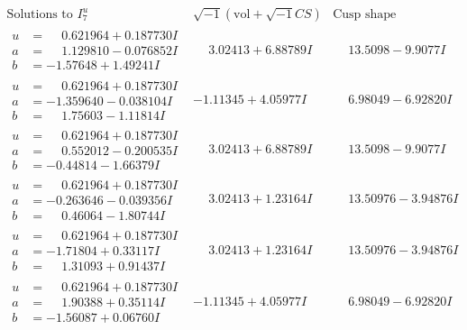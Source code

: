 \documentclass[1p]{elsarticle_modified}
\theoremstyle{definition}
\newcommand{\I}{\sqrt{-1}}
\begin{document}
$$\begin{array}{c|c|c}  
\text{Solutions to }I^u_{7}& \I (\text{vol} + \sqrt{-1}CS) & \text{Cusp shape}\\
 \hline 
\begin{aligned}
u &= \phantom{-}0.621964 + 0.187730 I \\
a &= \phantom{-}1.129810 - 0.076852 I \\
b &= -1.57648 + 1.49241 I\end{aligned}
 & \phantom{-}3.02413 + 6.88789 I & \phantom{-}13.5098 - 9.9077 I \\ \hline\begin{aligned}
u &= \phantom{-}0.621964 + 0.187730 I \\
a &= -1.359640 - 0.038104 I \\
b &= \phantom{-}1.75603 - 1.11814 I\end{aligned}
 & -1.11345 + 4.05977 I & \phantom{-}6.98049 - 6.92820 I \\ \hline\begin{aligned}
u &= \phantom{-}0.621964 + 0.187730 I \\
a &= \phantom{-}0.552012 - 0.200535 I \\
b &= -0.44814 - 1.66379 I\end{aligned}
 & \phantom{-}3.02413 + 6.88789 I & \phantom{-}13.5098 - 9.9077 I \\ \hline\begin{aligned}
u &= \phantom{-}0.621964 + 0.187730 I \\
a &= -0.263646 - 0.039356 I \\
b &= \phantom{-}0.46064 - 1.80744 I\end{aligned}
 & \phantom{-}3.02413 + 1.23164 I & \phantom{-}13.50976 - 3.94876 I \\ \hline\begin{aligned}
u &= \phantom{-}0.621964 + 0.187730 I \\
a &= -1.71804 + 0.33117 I \\
b &= \phantom{-}1.31093 + 0.91437 I\end{aligned}
 & \phantom{-}3.02413 + 1.23164 I & \phantom{-}13.50976 - 3.94876 I \\ \hline\begin{aligned}
u &= \phantom{-}0.621964 + 0.187730 I \\
a &= \phantom{-}1.90388 + 0.35114 I \\
b &= -1.56087 + 0.06760 I\end{aligned}
 & -1.11345 + 4.05977 I & \phantom{-}6.98049 - 6.92820 I \\ \hline\begin{aligned}

\end{aligned}
\end{array}$$
\end{document}
